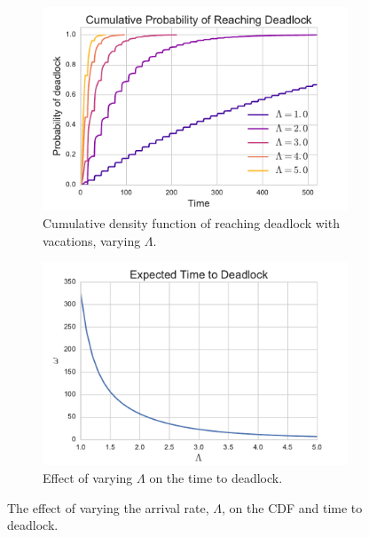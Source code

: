 \documentclass{article}
\begin{document}
\begin{figure}
\begin{center}
\begin{subfigure}[b]{0.45\textwidth}
    \includegraphics[width=\textwidth]{img/cdf_vary_L.pdf}
    \caption{Cumulative density function of reaching deadlock with vacations, varying $\Lambda$.}
    \label{fig:cdf_varyL}
\end{subfigure}
\begin{subfigure}[b]{0.45\textwidth}
    \includegraphics[width=\textwidth]{img/ttd_vary_L.pdf}
    \caption{Effect of varying $\Lambda$ on the time to deadlock.}
    \label{fig:ttd_varyL}
\end{subfigure}
\end{center}
\caption{The effect of varying the arrival rate, $\Lambda$, on the CDF and time to deadlock.}
\label{fig:ttdcdf_varyL}
\end{figure}
\end{document}
